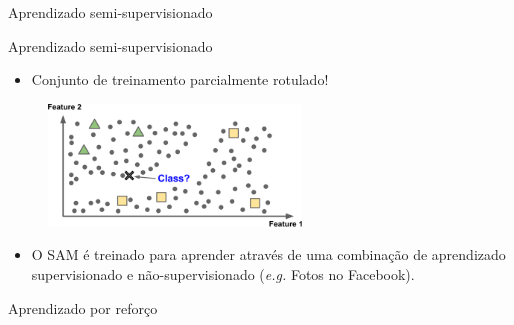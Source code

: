 \documentclass[12pt,mathserif,aspectratio=169]{beamer}
\begin{document}
\begin{frame}
	\Huge Aprendizado semi-supervisionado
\end{frame}

\begin{frame}{Aprendizado semi-supervisionado}
    \begin{itemize}
        \item Conjunto de treinamento parcialmente rotulado!
	\end{itemize}
	
	\begin{figure}
		\includegraphics[width=0.6\textwidth]{fig/fig1_11.jpg}
	\end{figure}
	
	\begin{itemize}
        \item O SAM é treinado para aprender através de uma combinação de aprendizado supervisionado e não-supervisionado ({\it e.g.} Fotos no Facebook).
    \end{itemize}
\end{frame}

\begin{frame}
	\Huge Aprendizado por reforço
\end{frame}
\end{document}
